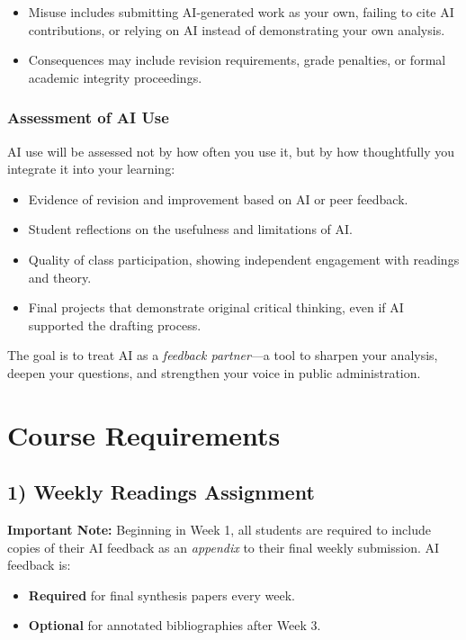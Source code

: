 \documentclass[12pt, letterpaper]{article}
\begin{document}
\begin{itemize}
    \item Misuse includes submitting AI-generated work as your own, failing to cite AI contributions, or relying on AI instead of demonstrating your own analysis.
    \item Consequences may include revision requirements, grade penalties, or formal academic integrity proceedings.
\end{itemize}

\subsubsection*{Assessment of AI Use}

AI use will be assessed not by how often you use it, but by how thoughtfully you integrate it into your learning:

\begin{itemize}
    \item Evidence of revision and improvement based on AI or peer feedback.
    \item Student reflections on the usefulness and limitations of AI.
    \item Quality of class participation, showing independent engagement with readings and theory.
    \item Final projects that demonstrate original critical thinking, even if AI supported the drafting process.
\end{itemize}

\noindent The goal is to treat AI as a \textit{feedback partner}---a tool to sharpen your analysis, deepen your questions, and strengthen your voice in public administration.


\section{Course Requirements}

\subsection*{1) Weekly Readings Assignment}

\textbf{Important Note:} Beginning in Week 1, all students are required to include copies of their AI feedback as an \emph{appendix} to their final weekly submission. AI feedback is:
\begin{itemize}
    \item \textbf{Required} for final synthesis papers every week.
    \item \textbf{Optional} for annotated bibliographies after Week 3.
\end{itemize}
\end{document}
